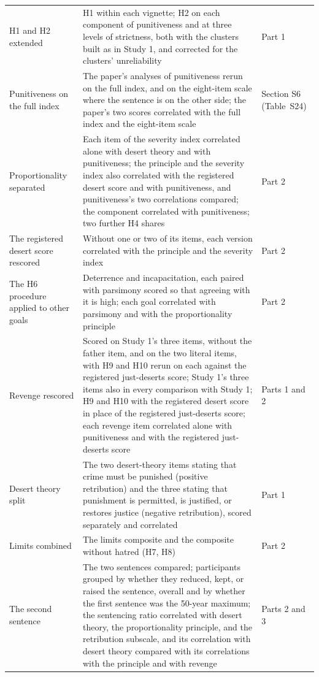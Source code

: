 \begin{longtable}{@{}>{\raggedright\arraybackslash}p{2.483in}>{\raggedright\arraybackslash}p{2.181in}>{\raggedright\arraybackslash}p{1.503in}@{}}
H1 and H2 extended & H1 within each vignette; H2 on each component of punitiveness and at three levels of strictness, both with the clusters built as in Study 1, and corrected for the clusters' unreliability & Part 1 \\
Punitiveness on the full index & The paper's analyses of punitiveness rerun on the full index, and on the eight-item scale where the sentence is on the other side; the paper's two scores correlated with the full index and the eight-item scale & Section S6 (Table~S24) \\
Proportionality separated & Each item of the severity index correlated alone with desert theory and with punitiveness; the principle and the severity index also correlated with the registered desert score and with punitiveness, and punitiveness's two correlations compared; the component correlated with punitiveness; two further H4 shares & Part 2 \\
The registered desert score rescored & Without one or two of its items, each version correlated with the principle and the severity index & Part 2 \\
The H6 procedure applied to other goals & Deterrence and incapacitation, each paired with parsimony scored so that agreeing with it is high; each goal correlated with parsimony and with the proportionality principle & Part 2 \\
Revenge rescored & Scored on Study 1's three items, without the father item, and on the two literal items, with H9 and H10 rerun on each against the registered just-deserts score; Study 1's three items also in every comparison with Study 1; H9 and H10 with the registered desert score in place of the registered just-deserts score; each revenge item correlated alone with punitiveness and with the registered just-deserts score & Parts 1 and 2 \\
Desert theory split & The two desert-theory items stating that crime must be punished (positive retribution) and the three stating that punishment is permitted, is justified, or restores justice (negative retribution), scored separately and correlated & Part 1 \\
Limits combined & The limits composite and the composite without hatred (H7, H8) & Part 2 \\
The second sentence & The two sentences compared; participants grouped by whether they reduced, kept, or raised the sentence, overall and by whether the first sentence was the 50-year maximum; the sentencing ratio correlated with desert theory, the proportionality principle, and the retribution subscale, and its correlation with desert theory compared with its correlations with the principle and with revenge & Parts 2 and 3 \\

\end{longtable}
